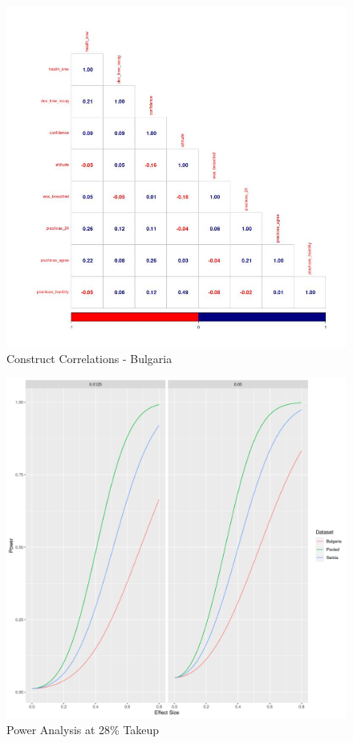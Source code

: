 \documentclass{article}
\begin{document}
\begin{figure}[H]
\begin{minipage}{.5\textwidth}
    \includegraphics[scale=0.33]{descriptives/plots/correlations_constructs_Bulgaria_Baseline.jpg}
    \caption{Construct Correlations - Bulgaria}
    \label{fig:bulgaria correlations}
\end{minipage}%
\end{figure}

\begin{figure}[H]
  \includegraphics[width=1.0\textwidth]{plots/Power Calculations.png}
  \caption{Power Analysis at 28\% Takeup}
  \label{fig:Power Analysis}
\end{figure}
\end{document}
